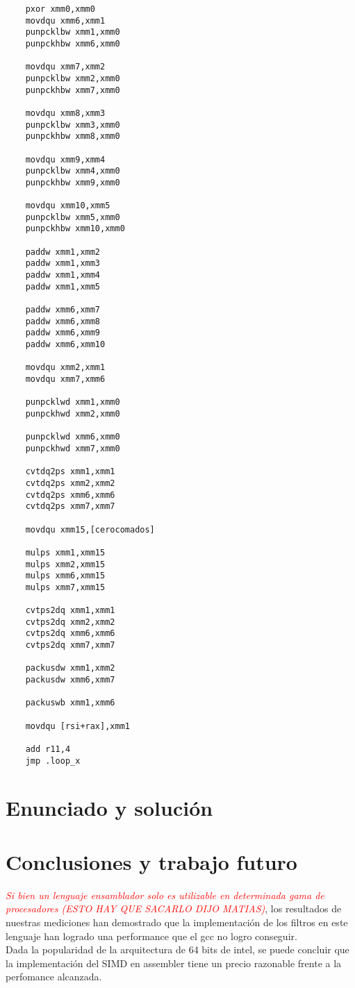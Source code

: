 \documentclass[a4paper]{article}
\begin{document}
 \begin{codesnippet}
\begin{verbatim}
    pxor xmm0,xmm0
    movdqu xmm6,xmm1
    punpcklbw xmm1,xmm0 
    punpckhbw xmm6,xmm0

    movdqu xmm7,xmm2
    punpcklbw xmm2,xmm0
    punpckhbw xmm7,xmm0

    movdqu xmm8,xmm3
    punpcklbw xmm3,xmm0
    punpckhbw xmm8,xmm0

    movdqu xmm9,xmm4
    punpcklbw xmm4,xmm0
    punpckhbw xmm9,xmm0

    movdqu xmm10,xmm5
    punpcklbw xmm5,xmm0
    punpckhbw xmm10,xmm0

    paddw xmm1,xmm2
    paddw xmm1,xmm3
    paddw xmm1,xmm4
    paddw xmm1,xmm5

    paddw xmm6,xmm7
    paddw xmm6,xmm8
    paddw xmm6,xmm9
    paddw xmm6,xmm10

    movdqu xmm2,xmm1
    movdqu xmm7,xmm6

    punpcklwd xmm1,xmm0
    punpckhwd xmm2,xmm0

    punpcklwd xmm6,xmm0
    punpckhwd xmm7,xmm0

    cvtdq2ps xmm1,xmm1  
    cvtdq2ps xmm2,xmm2  
    cvtdq2ps xmm6,xmm6  
    cvtdq2ps xmm7,xmm7

    movdqu xmm15,[cerocomados]

    mulps xmm1,xmm15
    mulps xmm2,xmm15
    mulps xmm6,xmm15
    mulps xmm7,xmm15

    cvtps2dq xmm1,xmm1
    cvtps2dq xmm2,xmm2
    cvtps2dq xmm6,xmm6
    cvtps2dq xmm7,xmm7

    packusdw xmm1,xmm2
    packusdw xmm6,xmm7

    packuswb xmm1,xmm6

    movdqu [rsi+rax],xmm1   

    add r11,4
    jmp .loop_x

\end{verbatim}
\end{codesnippet}


\newpage
\section{Enunciado y soluci\'on} 



\section{Conclusiones y trabajo futuro}
\indent\emph{ \textcolor{red}{Si bien un lenguaje ensamblador solo es utilizable en determinada gama de procesadores (ESTO HAY QUE SACARLO DIJO MATIAS)}}, los resultados de nuestras mediciones han demostrado que la implementación de los filtros en este lenguaje han logrado una performance que el gcc no logro conseguir. \\
\indent Dada la popularidad de la arquitectura de 64 bits de intel, se puede concluir que la implementación del SIMD en assembler tiene un precio razonable frente a la perfomance alcanzada.\\
\end{document}
